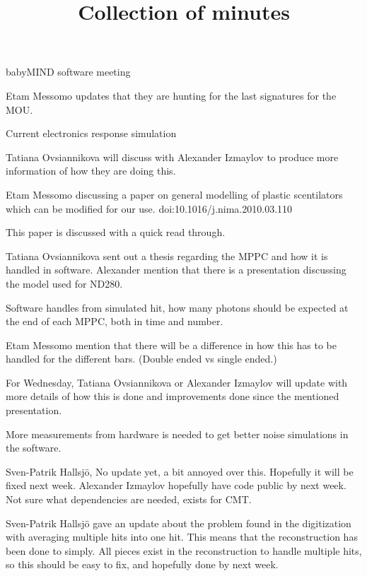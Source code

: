 \documentclass{article}
\title{Collection of minutes}
\author{\LaTeXe}
\begin{document}
\begin{Minutes}{babyMIND software meeting}
\maketitle

Etam Messomo updates that they are hunting for the last signatures for the MOU.

Current electronics response simulation

Tatiana Ovsiannikova will discuss with Alexander Izmaylov to produce more information of how they are doing this.

Etam Messomo discussing a paper on general modelling of plastic scentilators which can be modified for our use.
doi:10.1016/j.nima.2010.03.110

This paper is discussed with a quick read through.

Tatiana Ovsiannikova sent out a thesis regarding the MPPC and how it is handled in software.
Alexander mention that there is a presentation discussing the model used for ND280.

Software handles from simulated hit, how many photons should be expected at the end of each MPPC, both in time and number. 

Etam Messomo mention that there will be a difference in how this has to be handled for the different bars. (Double ended vs single ended.)

For Wednesday, Tatiana Ovsiannikova or Alexander Izmaylov will update with more details of how this is done and improvements done since the mentioned presentation.

More measurements from hardware is needed to get better noise simulations in the software. 

Sven-Patrik Hallsj\"o, No update yet, a bit annoyed over this. Hopefully it will be fixed next week. Alexander Izmaylov hopefully have code public by next week. Not sure what dependencies are needed, exists for CMT.


Sven-Patrik Hallsj\"o gave an update about the problem found in the digitization with averaging multiple hits into one hit. This means that the reconstruction has been done to simply. All pieces exist in the reconstruction to handle multiple hits, so this should be easy to fix, and hopefully done by next week.


\end{Minutes}
\end{document}
